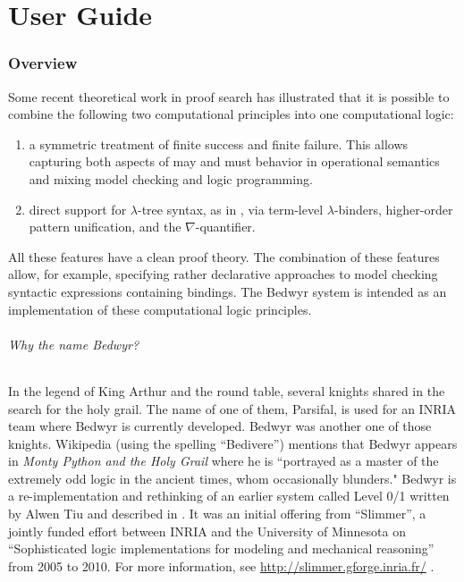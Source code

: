 \part{User Guide}


\section{Overview}

Some recent theoretical work in proof search has illustrated that it
is possible to combine the following two computational principles into
one computational logic:
\begin{enumerate}
  \item a symmetric treatment of finite success and finite failure.
    This allows capturing both aspects of may and must behavior in
    operational semantics and mixing model checking and logic programming.

  \item direct support for $\lambda$-tree syntax, as in \lp{},
    via term-level $\lambda$-binders, higher-order pattern
    unification, and the $\nabla$-quantifier.
\end{enumerate}
All these features have a clean proof theory.  The combination of
these features allow, for example, specifying rather declarative
approaches to model checking syntactic expressions containing
bindings.  The Bedwyr system is intended as an implementation of these
computational logic principles.

\paragraph{Why the name Bedwyr?}
In the legend of King Arthur and the round table, several knights
shared in the search for the holy grail.  The name of one of them,
Parsifal, is used for an INRIA team where Bedwyr is currently
developed. Bedwyr was another one of those knights.  Wikipedia (using
the spelling ``Bedivere'') mentions that Bedwyr appears in {\em Monty
Python and the Holy Grail} where he is ``portrayed as a master of the
extremely odd logic in the ancient times, whom occasionally blunders."
Bedwyr is a re-implementation and rethinking of an earlier system
called Level 0/1 written by Alwen Tiu and described in
\cite{tiu05eshol}. It was an initial offering from ``Slimmer'', a
jointly funded effort between INRIA and the University of Minnesota on
``Sophisticated logic implementations for modeling and mechanical
reasoning'' from 2005 to 2010. For more information, see
\urldef{\thisurl}\url{http://slimmer.gforge.inria.fr/}
\ahrefurl{\thisurl}.

